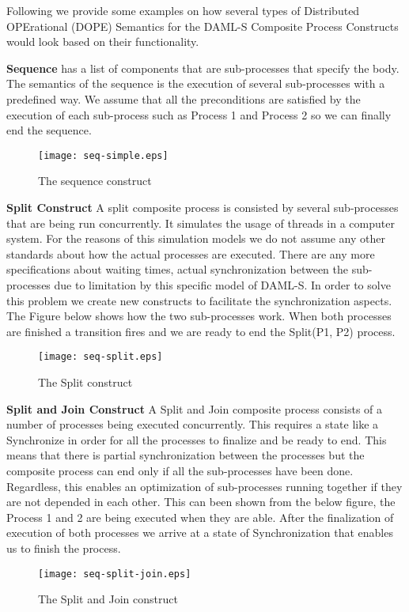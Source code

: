 Following we provide some examples on how several types of Distributed OPErational (DOPE) Semantics for the DAML-S Composite Process Constructs would look based on their functionality.

\vspace{1em}
\textbf{Sequence} has a list of components that are sub-processes that specify the body. The semantics of the sequence is the execution of several sub-processes with a predefined way. We assume that all the preconditions are satisfied by the execution of each sub-process such as Process 1 and Process 2 so we can finally end the sequence.
\begin{figure}[h]
    \centering
    \texttt{[image: seq-simple.eps]}
    \caption{The sequence construct}
    \label{fig:Conditional effects and outputs}
\end{figure}

\textbf{Split Construct} A split composite process is consisted by several sub-processes that are being run concurrently. It simulates the usage of threads in a computer system. For the reasons of this simulation models we do not assume any other standards about how the actual processes are executed. There are any more specifications about waiting times, actual synchronization between the sub-processes due to limitation by this specific model of DAML-S. In order to solve this problem we create new constructs to facilitate the synchronization aspects. The Figure below shows how the two sub-processes work. When both processes are finished a transition fires and we are ready to end the Split(P1, P2) process.
\begin{figure}[h]
    \centering
    \texttt{[image: seq-split.eps]}
    \caption{The Split construct}
    \label{fig:Conditional effects and outputs}
\end{figure}

\textbf{Split and Join Construct} A Split and Join composite process consists of a number of processes being executed concurrently. This requires a state like a Synchronize in order for all the processes to finalize and be ready to end. This means that there is partial synchronization between the processes but the composite process can end only if all the sub-processes have been done. Regardless, this enables an optimization of sub-processes running together if they are not depended in each other. This can been shown from the below figure, the Process 1 and 2 are being executed when they are able. After the finalization of execution of both processes we arrive at a state of Synchronization that enables us to finish the process.
\begin{figure}[H]
    \centering
    \texttt{[image: seq-split-join.eps]}
    \caption{The Split and Join construct}
    \label{fig:Conditional effects and outputs}
\end{figure}

